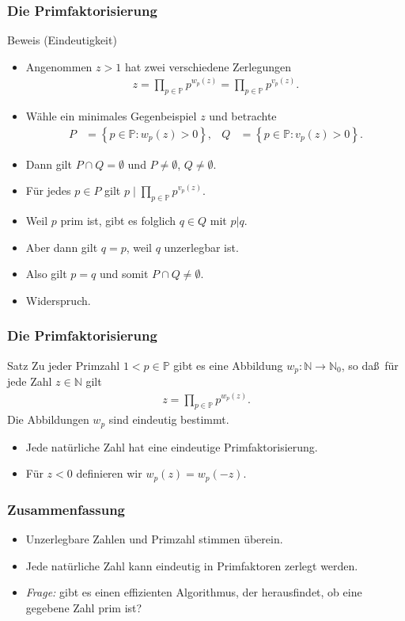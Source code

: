 \documentclass{beamer}
\renewcommand{\emph}[1]{{\textcolor{solarizedRed}{\itshape #1}}}
\newcommand\NN{\mathbb N}
\newcommand\PP{\mathbb P}
\newcommand\cbc[1]{\left\{{#1}\right\}}
\renewcommand{\ae}{\"a}
\newcommand{\ue}{\"u}
\begin{document}
\begin{frame}\frametitle{Die Primfaktorisierung}
	\begin{block}{Beweis (Eindeutigkeit)}
		\begin{itemize}
			\item Angenommen $z>1$ hat zwei verschiedene Zerlegungen
				\begin{align*}
					z=\prod_{p\in\PP}p^{w_p(z)}=\prod_{p\in\PP}p^{v_p(z)}.
				\end{align*}
			\item W\ae hle ein minimales Gegenbeispiel $z$ und betrachte
				\begin{align*}
					P&=\cbc{p\in\PP:w_p(z)>0},&Q&=\cbc{p\in\PP:v_p(z)>0}.
				\end{align*}
			\item Dann gilt $P\cap Q=\emptyset$ und $P\neq\emptyset$, $Q\neq\emptyset$.
			\item F\ue r jedes $p\in P$ gilt $p\mid\prod_{p\in\PP}p^{v_p(z)}$.
			\item Weil $p$ prim ist, gibt es folglich $q\in Q$ mit $p|q$.
			\item Aber dann gilt $q=p$, weil $q$ unzerlegbar ist.
			\item Also gilt $p=q$ und somit $P\cap Q\neq\emptyset$.
			\item Widerspruch.
		\end{itemize}
	\end{block}
\end{frame}

\begin{frame}\frametitle{Die Primfaktorisierung}
	\begin{block}{Satz}
		Zu jeder Primzahl $1<p\in\PP$ gibt es eine Abbildung $w_p:\NN\to\NN_0$, so da\ss\ f\ue r jede Zahl $z\in\NN$ gilt
		\begin{align*}
			z=\prod_{p\in\PP}p^{w_p(z)}.
		\end{align*}
		Die Abbildungen $w_p$ sind eindeutig bestimmt.
	\end{block}
	\begin{block}{}
		\begin{itemize}
			\item Jede nat\ue rliche Zahl hat eine eindeutige Primfaktorisierung.
			\item F\ue r $z<0$ definieren wir $w_p(z)=w_p(-z)$.
		\end{itemize}
	\end{block}
\end{frame}

\begin{frame}\frametitle{Zusammenfassung}
	\begin{itemize}
		\item Unzerlegbare Zahlen und Primzahl stimmen \ue berein.
		\item Jede nat\ue rliche Zahl kann eindeutig in Primfaktoren zerlegt werden.
		\item \emph{Frage:} gibt es einen effizienten Algorithmus, der herausfindet, ob eine gegebene Zahl prim ist?
	\end{itemize}
\end{frame}
\end{document}
